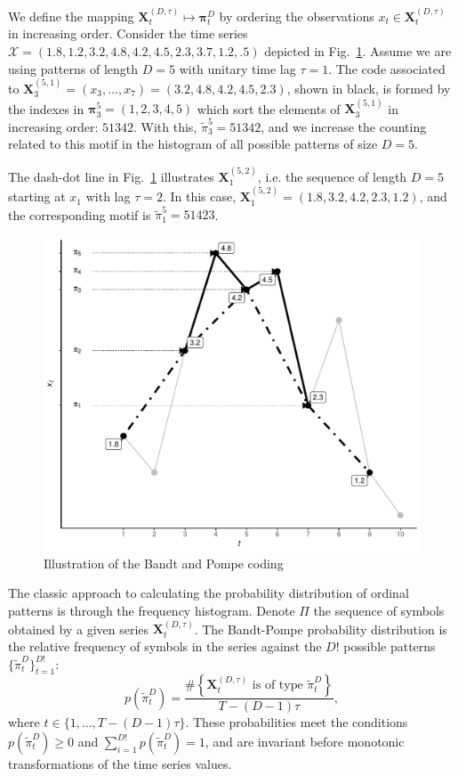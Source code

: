 \documentclass[journal]{IEEEtran}
\begin{document}
	We define the mapping ${\mathbf X}_t^{(D,\tau)} \mapsto {\mathbf \pi}_t^{D}$ by ordering the observations $x_t \in {\mathbf X}_t^{(D,\tau)}$ in increasing order.
	Consider the time series $\mathcal X = (1.8, 1.2, 3.2, 4.8, 4.2, 4.5, 2.3, 3.7, 1.2, .5)$ depicted in Fig.~\ref{Fig:IntroBP}.
	Assume we are using patterns of length $D=5$ with unitary time lag $\tau=1$.
	The code associated to $\mathbf X_{3}^{(5,1)}=(x_3,\dots,x_7)=(3.2, 4.8, 4.2, 4.5, 2.3)$, shown in black, is formed by the indexes in $\bm\pi_3^{5}=(1,2,3,4,5)$ which sort the elements of $\mathbf X_{3}^{(5,1)}$ in increasing order: $51342$.
	With this, $\widetilde{\pi}_3^{5} = 51342$, and we increase the counting related to this motif in the histogram of all possible patterns of size $D=5$.
	
	The dash-dot line in Fig.~\ref{Fig:IntroBP} illustrates $\mathbf X_{1}^{(5,2)}$, i.e. the sequence of length $D=5$ starting at $x_1$ with lag $\tau=2$.
	In this case, $\mathbf X_{1}^{(5,2)}= (1.8, 3.2, 4.2, 2.3, 1.2)$, and the corresponding motif is $\widetilde{\pi}_1^{5}=51423$.
	
	\begin{figure}[hbt]
		\centering
		\includegraphics[width=.9\linewidth]{Figures/IntroBP.pdf}
		\caption{Illustration of the Bandt and Pompe coding\label{Fig:IntroBP}}
	\end{figure}
	
	The classic approach to calculating the probability distribution of ordinal patterns is through the frequency histogram.
	Denote $\Pi$ the sequence of symbols obtained by a given series $\mathbf{X}_t^{(D,\tau)}$.
	The Bandt-Pompe probability distribution is the relative frequency of symbols in the series against the $D!$ possible patterns $\{\widetilde\pi_t^D \}_{t = 1}^{D!}$:
	\begin{equation}
	p(\widetilde\pi_t^D) = \frac{\#\left \{\mathbf{X}_t^{(D,\tau)} \text{ is of type } \widetilde\pi_t^D\right \}}{T- (D-1)\tau},  
	\end{equation}
	where  $t\in \{1, \dots, T-(D-1)\tau\}$.
	These probabilities meet the conditions $p(\widetilde\pi_t^D) \ge 0$ and  $\sum_{i=1}^{D!} p(\widetilde\pi_t^D) = 1$, and are invariant before monotonic transformations of the time series values.
	
\end{document}
